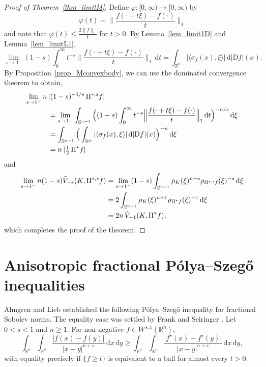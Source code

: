 \documentclass{amsart}
\newcommand{\opp}{\operatorname{\Pi}^*\!}
\newcommand{\ofpp}[1]{\operatorname{\Pi^{\ast,{\it #1}}}\!}
\newcommand{\snvtex}{{\mathbb S}^{n-1}}
\newcommand{\dvtex}{\,\mathrm{d}}
\newcommand{\Dvtex}{\mathrm{D}}
\newcommand{\vol}[1]{ \vert #1\vert}
\begin{document}
\begin{proof}[Proof of Theorem~\ref{thm_limitM}]
Define $\varphi : [0,\infty )\to [0,\infty )$ by
%
\begin{equation*}
\varphi (t) = \Big\|\frac{f(\cdot +t\xi )-f(\cdot )}{t}\Big\|_{1}
\end{equation*}
%
and note that $\varphi (t) \leq \frac{2\|f\|_{1}}{t}$ for $t> 0$. By Lemma~\ref{lem_limit1D} and Lemma~\ref{lem_limitL1},
%
\begin{equation*}
\lim _{s\to 1^{-}} (1-s) \int _{0}^{\infty }t^{-s} \Big\|
\frac{f(\cdot +t\xi )-f(\cdot )}{t}\Big\|_{1} \dvtex t = \int _{\mathbb R^{n}}
|\langle \sigma _{f}(x),\xi \rangle |\dvtex |\Dvtex f|(x).
\end{equation*}
%
By Proposition~\ref{prop_Mconvexbody}, we can use the dominated convergence
theorem to obtain,
%
\begin{align*}
\lim _{s\to 1^{-}}n\, &\vol{(1-s)^{-1/s} \ofpp{s} f}
\\
&= \lim _{s\to 1^{-}}\int _{\snvtex} \Big( (1-s) \int _{0}^{\infty }t^{-s}
\Big\|\frac{f(\cdot +t\xi )-f(\cdot )}{t}\Big\|_{1} \dvtex t \Big)^{-n/s}
\dvtex \xi
\\
&= \int _{\snvtex} \Big( \int _{\mathbb R^{n}} |\langle \sigma _{f}(x),
\xi \rangle |\dvtex \vert \Dvtex f\vert (x) \Big)^{-n} \dvtex \xi
\\
&= n\, \vol{ \tfrac {1}{2} \opp f}
\end{align*}
%
and
%
\begin{align*}
\lim _{s\to 1^{-}} n (1-s)\tilde V_{-s}(K, \ofpp{s} f) &= \lim _{s
\to 1^{-}}(1-s) \int _{\snvtex} \rho _{K}(\xi )^{n+s} \rho _{\ofpp{s} f}(
\xi )^{-s} \dvtex \xi
\\
&= 2 \int _{\snvtex} \rho _{K}(\xi )^{n+1} \rho _{\opp f}(\xi )^{-1} \dvtex
\xi
\\
&= 2n\,\tilde V_{-1}(K, \opp f),
\end{align*}
%
which completes the proof of the theorem.
\end{proof}

\section{Anisotropic fractional P\'olya--Szeg\H o inequalities}

Almgren and Lieb \cite{AlmgrenLieb} established the following P\'olya--Szeg\H o
inequality for fractional Sobolev norms. The equality case was settled
by Frank and Seiringer \cite{FrankSeiringer}. Let $0<s<1$ and
$n\ge 1$. For non-negative $f\in W^{s,1}(\mathbb R^{n})$,
%
\begin{equation}
\label{eq_EPS}
\int _{\mathbb R^{n}} \int _{\mathbb R^{n}}
\frac{\vert f(x)-f(y)\vert}{\vert x-y \vert ^{n+s}}\dvtex x\dvtex y \ge \int _{
\mathbb R^{n}} \int _{\mathbb R^{n}}
\frac{\vert f^{\star}(x)-f^{\star}(y)\vert}{\vert x-y \vert ^{n+s}}
\dvtex x\dvtex y,
\end{equation}
%
with equality precisely if $\{f \ge t\}$ is equivalent to a ball for almost
every $t>0$.
\end{document}
